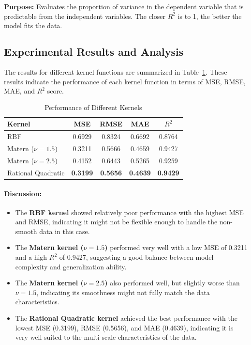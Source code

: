 \documentclass[11pt]{article}
\begin{document}
\textbf{Purpose:} Evaluates the proportion of variance in the dependent variable that is predictable from the independent variables. The closer $R^2$ is to 1, the better the model fits the data.

\subsection{Experimental Results and Analysis}

The results for different kernel functions are summarized in Table~\ref{tab:results}. These results indicate the performance of each kernel function in terms of MSE, RMSE, MAE, and $R^2$ score.

\begin{table}[h]
\centering
\caption{Performance of Different Kernels}
\label{tab:results}
\begin{tabular}{lcccc}
\hline
\textbf{Kernel} & \textbf{MSE} & \textbf{RMSE} & \textbf{MAE} & \textbf{$R^2$} \\
\hline
RBF & 0.6929 & 0.8324 & 0.6692 & 0.8764 \\
Matern ($\nu=1.5$) & 0.3211 & 0.5666 & 0.4659 & 0.9427 \\
Matern ($\nu=2.5$) & 0.4152 & 0.6443 & 0.5265 & 0.9259 \\
Rational Quadratic & \textbf{0.3199} & \textbf{0.5656} & \textbf{0.4639} & \textbf{0.9429} \\
\hline
\end{tabular}
\end{table}

\paragraph{Discussion:}

\begin{itemize}
    \item The \textbf{RBF kernel} showed relatively poor performance with the highest MSE and RMSE, indicating it might not be flexible enough to handle the non-smooth data in this case.
    \item The \textbf{Matern kernel ($\nu=1.5$)} performed very well with a low MSE of 0.3211 and a high $R^2$ of 0.9427, suggesting a good balance between model complexity and generalization ability.
    \item The \textbf{Matern kernel ($\nu=2.5$)} also performed well, but slightly worse than $\nu=1.5$, indicating its smoothness might not fully match the data characteristics.
    \item The \textbf{Rational Quadratic kernel} achieved the best performance with the lowest MSE (0.3199), RMSE (0.5656), and MAE (0.4639), indicating it is very well-suited to the multi-scale characteristics of the data.
\end{itemize}
\end{document}
